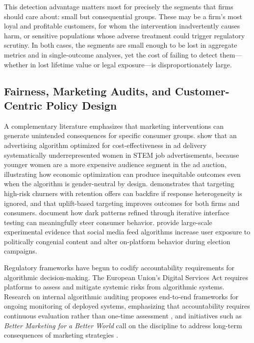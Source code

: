 \documentclass[11pt,letterpaper,english]{article}
\theoremstyle{definition}
\theoremstyle{definition}
\begin{document}
\begin{bibunit}
This detection advantage matters most for precisely the segments that firms should care about: small but consequential groups. These may be a firm's most loyal and profitable customers, for whom the intervention inadvertently causes harm, or sensitive populations whose adverse treatment could trigger regulatory scrutiny. In both cases, the segments are small enough to be lost in aggregate metrics and in single-outcome analyses, yet the cost of failing to detect them---whether in lost lifetime value or legal exposure---is disproportionately large.

\subsection{Fairness, Marketing Audits, and Customer-Centric Policy Design}
\label{sec:lit-fairness}

A complementary literature emphasizes that marketing interventions can generate unintended consequences for specific consumer groups. \citet{lambrecht2019algorithmic} show that an advertising algorithm optimized for cost-effectiveness in ad delivery systematically underrepresented women in STEM job advertisements, because younger women are a more expensive audience segment in the ad auction, illustrating how economic optimization can produce inequitable outcomes even when the algorithm is gender-neutral by design. \citet{ascarza2018retention} demonstrates that targeting high-risk churners with retention offers can backfire if response heterogeneity is ignored, and that uplift-based targeting improves outcomes for both firms and consumers. \citet{luguri2021shining} document how dark patterns refined through iterative interface testing can meaningfully steer consumer behavior. \citet{guess2023social} provide large-scale experimental evidence that social media feed algorithms increase user exposure to politically congenial content and alter on-platform behavior during election campaigns.

Regulatory frameworks have begun to codify accountability requirements for algorithmic decision-making. The European Union's Digital Services Act \citep{dsa2022article34} requires platforms to assess and mitigate systemic risks from algorithmic systems. Research on internal algorithmic auditing proposes end-to-end frameworks for ongoing monitoring of deployed systems, emphasizing that accountability requires continuous evaluation rather than one-time assessment \citep{raji2020_internal_audit}, and initiatives such as \emph{Better Marketing for a Better World} call on the discipline to address long-term consequences of marketing strategies \citep{chandy2021better}.


\end{bibunit}
\end{document}
